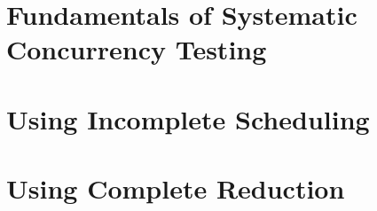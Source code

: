 \blindtext

\section{Fundamentals of Systematic Concurrency Testing}
\label{sec:sct-fundamentals}
\blindtext

\section{Using Incomplete Scheduling}
\label{sec:sct-incomplete}
\blindtext

\section{Using Complete Reduction}
\label{sec:sct-complete}
\blindtext

